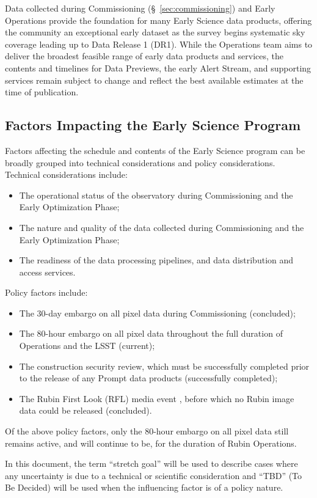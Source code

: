 Data collected during Commissioning (\S~\ref{sec:commissioning}) and Early Operations provide the foundation for many Early Science data products, offering the community an exceptional early dataset as the survey begins systematic sky coverage leading up to Data Release 1 (DR1).
While the Operations team aims to deliver the broadest feasible range of early data products and services, the contents and timelines for Data Previews, the early Alert Stream, and supporting services remain subject to change and reflect the best available estimates at the time of publication.

\subsection{Factors Impacting the Early Science Program}
\label{ssec:impact}
Factors affecting the schedule and contents of the Early Science program can be broadly grouped into technical considerations and policy considerations.
Technical considerations include:
\begin{itemize}
\item The operational status of the observatory during Commissioning  and the Early Optimization Phase;
\item The nature and quality of the data collected during Commissioning and the Early Optimization Phase;
\item The readiness of the data processing pipelines, and data distribution and access services.
\end{itemize}
Policy factors include:
\begin{itemize}
\item The 30-day embargo on all pixel data during Commissioning (concluded);
\item The 80-hour embargo on all pixel data throughout the full duration of Operations and the LSST (current);
\item The  construction security review, which must be successfully completed prior to the release of any Prompt data products (successfully completed);
\item The Rubin First Look (RFL) media event \citep[][]{RTN-083},  before which no Rubin image data could be released (concluded).
\end{itemize}
Of the above policy factors, only the 80-hour embargo on all pixel data still remains active, and will continue to be, for the duration of Rubin Operations.

In this document, the term ``stretch goal'' will be used to describe cases where any uncertainty is due to a technical or scientific consideration and ``TBD'' (To Be Decided) will be used when the influencing factor is of a policy nature.